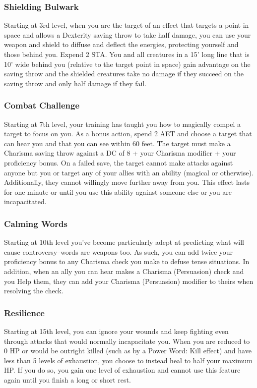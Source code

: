 \subsubsection{Shielding Bulwark}
Starting at 3rd level, when you are the target of an effect that targets a point in space and allows a Dexterity saving throw to take half damage, you can use your weapon and shield to diffuse and deflect the energies, protecting yourself and those behind you. Expend 2 STA. You and all creatures in a 15' long line that is 10' wide behind you (relative to the target point in space) gain advantage on the saving throw and the shielded creatures take no damage if they succeed on the saving throw and only half damage if they fail.

\subsubsection{Combat Challenge}
Starting at 7th level, your training has taught you how to magically compel a target to focus on you. As a bonus action, spend 2 AET and choose a target that can hear you and that you can see within 60 feet. The target must make a Charisma saving throw against a DC of 8 + your Charisma modifier + your proficiency bonus. On a failed save, the target cannot make attacks against anyone but you or target any of your allies with an ability (magical or otherwise). Additionally, they cannot willingly move further away from you. This effect lasts for one minute or until you use this ability against someone else or you are incapacitated.

\subsubsection{Calming Words}
Starting at 10th level you've become particularly adept at predicting what will cause controversy--words are weapons too. As such, you can add twice your proficiency bonus to any Charisma check you make to defuse tense situations. In addition, when an ally you can hear makes a Charisma (Persuasion) check and you Help them, they can add your Charisma (Persuasion) modifier to theirs when resolving the check.

\subsubsection{Resilience}
Starting at 15th level, you can ignore your wounds and keep fighting even through attacks that would normally incapacitate you. When you are reduced to 0 HP or would be outright killed (such as by a Power Word: Kill effect) and have less than 5 levels of exhaustion, you choose to instead heal to half your maximum HP. If you do so, you gain one level of exhaustion and cannot use this feature again until you finish a long or short rest.

